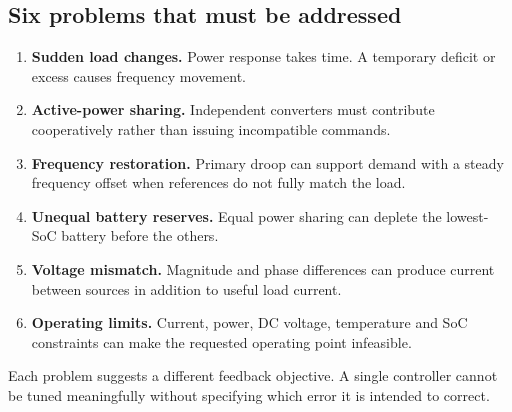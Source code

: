 \documentclass[11pt,a4paper]{article}
\begin{document}
\subsection{Six problems that must be addressed}
\begin{enumerate}
\item \textbf{Sudden load changes.} Power response takes time. A temporary deficit or excess causes frequency movement.
\item \textbf{Active-power sharing.} Independent converters must contribute cooperatively rather than issuing incompatible commands.
\item \textbf{Frequency restoration.} Primary droop can support demand with a steady frequency offset when references do not fully match the load.
\item \textbf{Unequal battery reserves.} Equal power sharing can deplete the lowest-SoC battery before the others.
\item \textbf{Voltage mismatch.} Magnitude and phase differences can produce current between sources in addition to useful load current.
\item \textbf{Operating limits.} Current, power, DC voltage, temperature and SoC constraints can make the requested operating point infeasible.
\end{enumerate}
Each problem suggests a different feedback objective. A single controller cannot be tuned meaningfully without specifying which error it is intended to correct.
\end{document}

